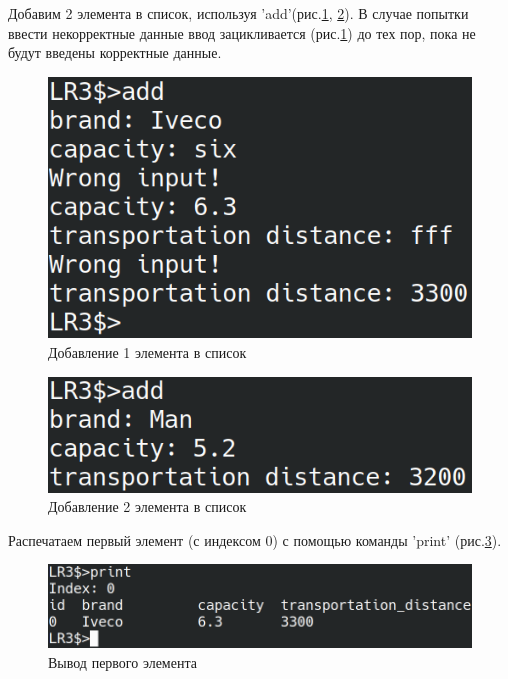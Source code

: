 Добавим 2 элемента в список, используя 'add'(рис.\ref{test.add}, \ref{test.add2}).
В случае попытки ввести некорректные данные 
ввод зацикливается (рис.\ref{test.add}) до тех пор,
пока не будут введены корректные данные.

\begin{figure}[H]
    \centering
    \includegraphics[width=0.9\linewidth]{photo/test.add}
    \caption{Добавление 1 элемента в список}
    \label{test.add}
\end{figure}

\begin{figure}[H]
    \centering
    \includegraphics[width=0.9\linewidth]{photo/test.add2}
    \caption{Добавление 2 элемента в список}
    \label{test.add2}
\end{figure}

Распечатаем первый элемент (с индексом 0) с помощью команды 'print' (рис.\ref{test.print0}).

\begin{figure}[hpt!]
    \centering
    \includegraphics[width=0.9\linewidth]{photo/test.print0}
    \caption{Вывод первого элемента}
    \label{test.print0}
\end{figure}

